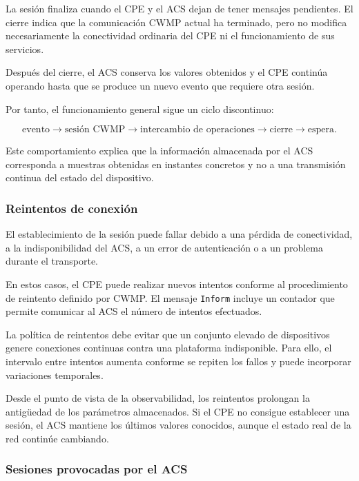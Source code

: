 La sesión finaliza cuando el CPE y el ACS dejan de tener mensajes
pendientes. El cierre indica que la comunicación CWMP actual ha
terminado, pero no modifica necesariamente la conectividad ordinaria del
CPE ni el funcionamiento de sus servicios.

Después del cierre, el ACS conserva los valores obtenidos y el CPE
continúa operando hasta que se produce un nuevo evento que requiere otra
sesión.

Por tanto, el funcionamiento general sigue un ciclo discontinuo:

\[
    \text{evento}
    \longrightarrow
    \text{sesión CWMP}
    \longrightarrow
    \text{intercambio de operaciones}
    \longrightarrow
    \text{cierre}
    \longrightarrow
    \text{espera}.
\]

Este comportamiento explica que la información almacenada por el ACS
corresponda a muestras obtenidas en instantes concretos y no a una
transmisión continua del estado del dispositivo.


\subsubsection*{Reintentos de conexión}

El establecimiento de la sesión puede fallar debido a una pérdida de
conectividad, a la indisponibilidad del ACS, a un error de autenticación
o a un problema durante el transporte.

En estos casos, el CPE puede realizar nuevos intentos conforme al
procedimiento de reintento definido por CWMP. El mensaje
\texttt{Inform} incluye un contador que permite comunicar al ACS el número
de intentos efectuados.

La política de reintentos debe evitar que un conjunto elevado de
dispositivos genere conexiones continuas contra una plataforma
indisponible. Para ello, el intervalo entre intentos aumenta conforme se
repiten los fallos y puede incorporar variaciones temporales.

Desde el punto de vista de la observabilidad, los reintentos prolongan la
antigüedad de los parámetros almacenados. Si el CPE no consigue
establecer una sesión, el ACS mantiene los últimos valores conocidos,
aunque el estado real de la red continúe cambiando.


\subsubsection*{Sesiones provocadas por el ACS}

